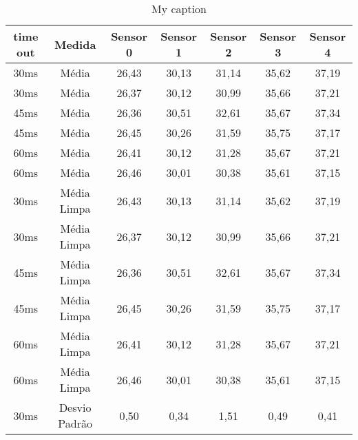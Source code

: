 \begin{table}[]
\centering
\caption{My caption}
\label{my-label}
\begin{tabular}{|c|c|ccccc|}
\hline
\textbf{time out} & \textbf{Medida}     & \textbf{Sensor 0} & \textbf{Sensor 1} & \textbf{Sensor 2} & \textbf{Sensor 3} & \textbf{Sensor 4} \\ \hline
30ms              & Média               & 26,43             & 30,13             & 31,14             & 35,62             & 37,19             \\
30ms              & Média               & 26,37             & 30,12             & 30,99             & 35,66             & 37,21             \\
45ms              & Média               & 26,36             & 30,51             & 32,61             & 35,67             & 37,34             \\
45ms              & Média               & 26,45             & 30,26             & 31,59             & 35,75             & 37,17             \\
60ms              & Média               & 26,41             & 30,12             & 31,28             & 35,67             & 37,21             \\
60ms              & Média               & 26,46             & 30,01             & 30,38             & 35,61             & 37,15             \\ \hline
30ms              & Média Limpa         & 26,43             & 30,13             & 31,14             & 35,62             & 37,19             \\
30ms              & Média Limpa         & 26,37             & 30,12             & 30,99             & 35,66             & 37,21             \\
45ms              & Média Limpa         & 26,36             & 30,51             & 32,61             & 35,67             & 37,34             \\
45ms              & Média Limpa         & 26,45             & 30,26             & 31,59             & 35,75             & 37,17             \\
60ms              & Média Limpa         & 26,41             & 30,12             & 31,28             & 35,67             & 37,21             \\
60ms              & Média Limpa         & 26,46             & 30,01             & 30,38             & 35,61             & 37,15             \\ \hline
30ms              & Desvio Padrão       & 0,50              & 0,34              & 1,51              & 0,49              & 0,41              \\

\end{tabular}
\end{table}
